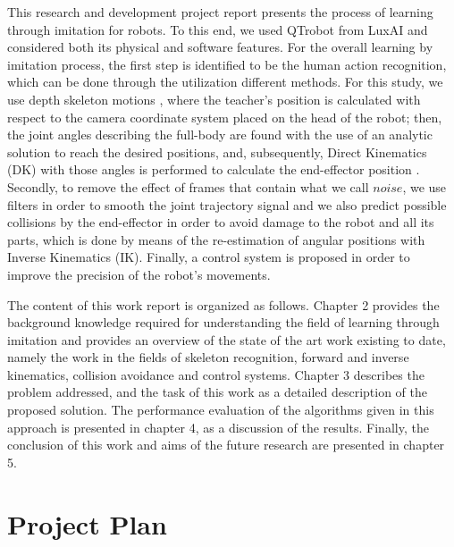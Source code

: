 \documentclass[thesis]{mas_proposal}
\begin{document}
\begin{itemize}
    This research and development project report presents the process of learning through imitation for robots. To this end, we used QTrobot from LuxAI \cite{qtrobot_safety_manual} and considered both its physical and software features. For the overall learning by imitation process, the first step is identified to be the human action recognition, which can be done through the utilization different methods. For this study, we use depth skeleton motions \cite{Chen_2016}, where the teacher's position is calculated with respect to the camera coordinate system placed on the head of the robot; then, the joint angles describing the full-body are found with the use of an analytic solution to reach the desired positions, and, subsequently, Direct Kinematics (DK) with those angles is performed to calculate the end-effector position \cite{Riley}. Secondly, to remove the effect of frames that contain what we call $noise$, we use filters in order to smooth the joint trajectory signal and we also predict possible collisions by the end-effector in order to avoid damage to the robot and all its parts, which is done by means of the re-estimation of angular positions with Inverse Kinematics (IK). Finally, a control system is proposed in order to improve the precision of the robot's movements.
    
    The content of this work report is organized as follows. Chapter 2 provides the background knowledge required for understanding the field of learning through imitation and provides an overview of the state of the art work existing to date, namely the work in the fields of skeleton recognition, forward and inverse kinematics, collision avoidance and control systems. Chapter 3 describes the problem addressed, and the task of this work as a detailed description of the proposed solution. The performance evaluation of the algorithms given in this approach is presented in chapter 4, as a discussion of the results. Finally, the conclusion of this work and aims of the future research are presented in chapter 5.
\end{itemize}

\section{Project Plan}
\end{document}
